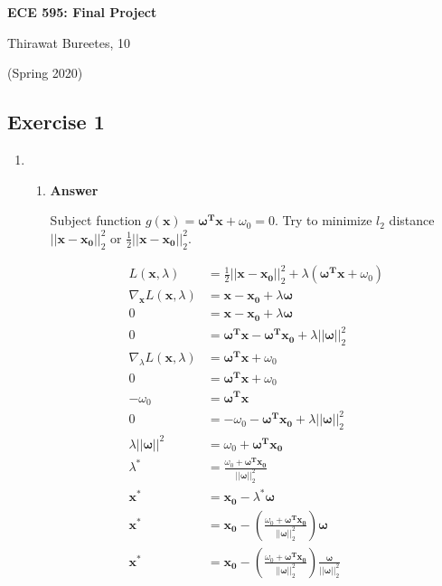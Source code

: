 \documentclass[11pt]{article}
\begin{document}
\begin{center}
\Large{\textbf{ECE 595: Final Project}}

Thirawat Bureetes, 10

(Spring 2020)
\end{center}


\subsection*{Exercise 1}
\begin{enumerate}[label=(\alph*)]


\item 

\begin{enumerate}[label=(\roman*)]

\item \noindent\textbf{Answer}

Subject function $g(\mathbf{x}) = \boldsymbol{\omega^T}\mathbf{x} + \omega_0 = 0$. Try to minimize $l_2$ distance $||\mathbf{x}-\mathbf{x_0}||_2^2$ or $\frac{1}{2}||\mathbf{x}-\mathbf{x_0}||_2^2$.

\begin{align*}
L(\mathbf{x}, \lambda) &= \frac{1}{2}||\mathbf{x}-\mathbf{x_0}||_2^2 + \lambda(\boldsymbol{\omega^T}\mathbf{x} + \omega_0)\\
\nabla_\mathbf{x} L(\mathbf{x}, \lambda) &= \mathbf{x}-\mathbf{x_0} + \lambda\boldsymbol{\omega}\\
0 &= \mathbf{x}-\mathbf{x_0} + \lambda\boldsymbol{\omega} \\
0 &= \boldsymbol{\omega^T}\mathbf{x}-\boldsymbol{\omega^T}\mathbf{x_0} + \lambda||\boldsymbol{\omega}||_2^2 \\
\nabla_\lambda L(\mathbf{x}, \lambda) &= \boldsymbol{\omega^T}\mathbf{x} + \omega_0\\
0 &= \boldsymbol{\omega^T}\mathbf{x} + \omega_0\\
- \omega_0 &= \boldsymbol{\omega^T}\mathbf{x}\\
0 &= - \omega_0-\boldsymbol{\omega^T}\mathbf{x_0} + \lambda||\boldsymbol{\omega}||_2^2 \\
\lambda||\boldsymbol{\omega}||^2 &=  \omega_0 + \boldsymbol{\omega^T}\mathbf{x_0} \\
\lambda^* &=  \frac{\omega_0 + \boldsymbol{\omega^T}\mathbf{x_0}}{||\boldsymbol{\omega}||_2^2} \\
\mathbf{x^*} &= \mathbf{x_0} - \lambda^* \boldsymbol{\omega} \\
\mathbf{x^*} &= \mathbf{x_0} - (\frac{\omega_0 + \boldsymbol{\omega^T}\mathbf{x_0}}{||\boldsymbol{\omega}||_2^2}) \boldsymbol{\omega} \\
\mathbf{x^*} &= \mathbf{x_0} - (\frac{\omega_0 + \boldsymbol{\omega^T}\mathbf{x_0}}{||\boldsymbol{\omega}||_2^2})\frac{ \boldsymbol{\omega}}{||\boldsymbol{\omega}||_2^2} \\
\end{align*}


\end{enumerate}
\end{enumerate}
\end{document}
